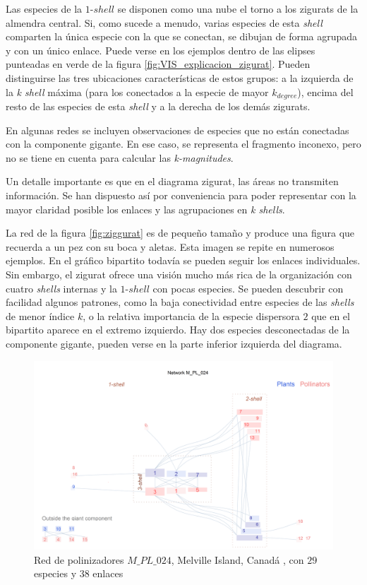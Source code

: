 Las especies de la $1$-$shell$ se disponen como una nube el torno a los zigurats de la almendra central. Si, como sucede a menudo, varias especies de esta \textit{shell} comparten la única especie con la que se conectan, se dibujan de forma agrupada y con un único enlace. Puede verse en los ejemplos dentro de las elipses punteadas en verde de la figura \ref{fig:VIS_explicacion_zigurat}. Pueden distinguirse las tres ubicaciones características de estos grupos: a la izquierda de la \textit{k shell} máxima (para los conectados a la especie de mayor $k_{degree}$), encima del resto de las especies de esta \textit{shell} y a la derecha de los demás zigurats.

En algunas redes se incluyen observaciones de especies que no están conectadas con la componente gigante. En ese caso, se representa el fragmento inconexo, pero no se tiene en cuenta para calcular las \textit{k-magnitudes}.

Un detalle importante es que en el diagrama zigurat, las áreas no transmiten información. Se han dispuesto así por conveniencia para poder representar con la mayor claridad posible los enlaces y las agrupaciones en \textit{k shells}.

La red de la figura \ref{fig:ziggurat} es de pequeño tamaño y produce una figura que recuerda a un pez con su boca y aletas. Esta imagen se repite en numerosos ejemplos. En el gráfico bipartito todavía se pueden seguir los enlaces individuales. Sin embargo, el zigurat ofrece una visión mucho más rica de la organización con cuatro \textit{shells} internas y la $1$-$shell$ con pocas especies. Se pueden descubrir con facilidad algunos patrones, como la baja conectividad entre especies de las \textit{shells} de menor índice $k$, o la relativa importancia de la especie dispersora $2$ que en el bipartito aparece en el extremo izquierdo. Hay dos especies desconectadas de la componente gigante, pueden verse en la parte inferior izquierda del diagrama.

\begin{figure}[hp!]
\centering
\includegraphics[scale=0.45]{Figures/VIS_M_PL_024_ziggurat.png}
\caption {Red de polinizadores $M\_PL\_024$, Melville Island, Canadá \cite{mosquin1967observations}, con $29$ especies y $38$ enlaces}
\label{fig:VIS_zig_pl_024}
\end{figure}


